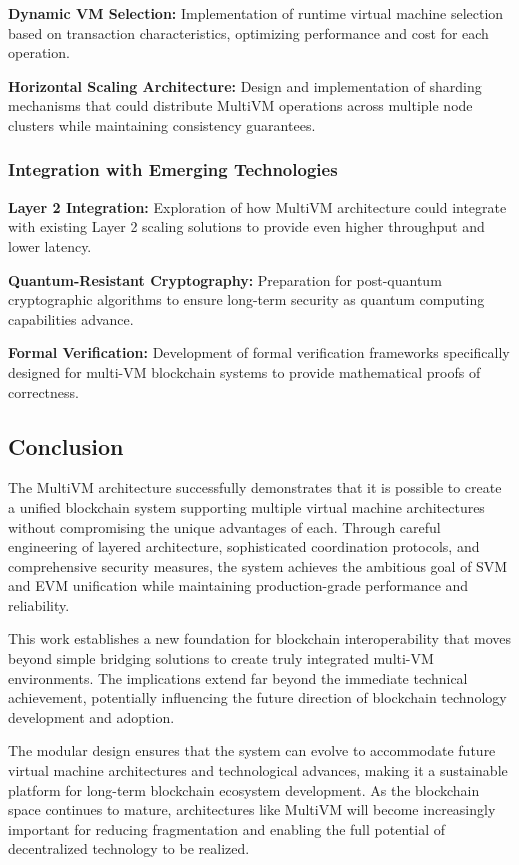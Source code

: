 \documentclass[11pt,a4paper]{article}
\begin{document}
\textbf{Dynamic VM Selection:}
Implementation of runtime virtual machine selection based on transaction characteristics, optimizing performance and cost for each operation.

\textbf{Horizontal Scaling Architecture:}
Design and implementation of sharding mechanisms that could distribute MultiVM operations across multiple node clusters while maintaining consistency guarantees.

\subsubsection{Integration with Emerging Technologies}

\textbf{Layer 2 Integration:}
Exploration of how MultiVM architecture could integrate with existing Layer 2 scaling solutions to provide even higher throughput and lower latency.

\textbf{Quantum-Resistant Cryptography:}
Preparation for post-quantum cryptographic algorithms to ensure long-term security as quantum computing capabilities advance.

\textbf{Formal Verification:}
Development of formal verification frameworks specifically designed for multi-VM blockchain systems to provide mathematical proofs of correctness.

\subsection{Conclusion}

The MultiVM architecture successfully demonstrates that it is possible to create a unified blockchain system supporting multiple virtual machine architectures without compromising the unique advantages of each. Through careful engineering of layered architecture, sophisticated coordination protocols, and comprehensive security measures, the system achieves the ambitious goal of SVM and EVM unification while maintaining production-grade performance and reliability.

This work establishes a new foundation for blockchain interoperability that moves beyond simple bridging solutions to create truly integrated multi-VM environments. The implications extend far beyond the immediate technical achievement, potentially influencing the future direction of blockchain technology development and adoption.

The modular design ensures that the system can evolve to accommodate future virtual machine architectures and technological advances, making it a sustainable platform for long-term blockchain ecosystem development. As the blockchain space continues to mature, architectures like MultiVM will become increasingly important for reducing fragmentation and enabling the full potential of decentralized technology to be realized.
\end{document}
